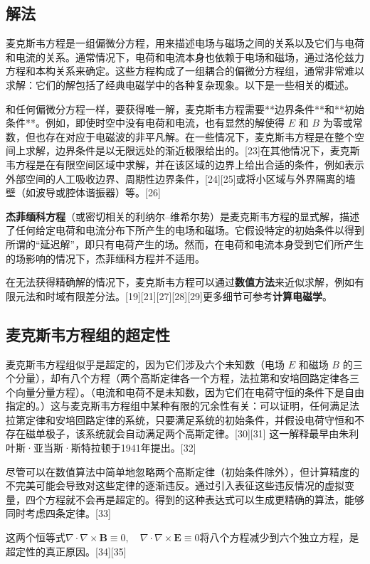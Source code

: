 \subsection{解法}
麦克斯韦方程是一组偏微分方程，用来描述电场与磁场之间的关系以及它们与电荷和电流的关系。通常情况下，电荷和电流本身也依赖于电场和磁场，通过洛伦兹力方程和本构关系来确定。这些方程构成了一组耦合的偏微分方程组，通常非常难以求解：它们的解包括了经典电磁学中的各种复杂现象。以下是一些相关的概述。

和任何偏微分方程一样，要获得唯一解，麦克斯韦方程需要**边界条件**和**初始条件**。例如，即使时空中没有电荷和电流，也有显然的解使得 \( E \) 和 \( B \) 为零或常数，但也存在对应于电磁波的非平凡解。在一些情况下，麦克斯韦方程是在整个空间上求解，边界条件是以无限远处的渐近极限给出的。[23]在其他情况下，麦克斯韦方程是在有限空间区域中求解，并在该区域的边界上给出合适的条件，例如表示外部空间的人工吸收边界、周期性边界条件，[24][25]或将小区域与外界隔离的墙壁（如波导或腔体谐振器）等。[26]

\textbf{杰菲缅科方程}（或密切相关的利纳尔–维希尔势）是麦克斯韦方程的显式解，描述了任何给定电荷和电流分布下所产生的电场和磁场。它假设特定的初始条件以得到所谓的“延迟解”，即只有电荷产生的场。然而，在电荷和电流本身受到它们所产生的场影响的情况下，杰菲缅科方程并不适用。

在无法获得精确解的情况下，麦克斯韦方程可以通过\textbf{数值方法}来近似求解，例如有限元法和时域有限差分法。[19][21][27][28][29]更多细节可参考\textbf{计算电磁学}。
\subsection{麦克斯韦方程组的超定性}
麦克斯韦方程组似乎是超定的，因为它们涉及六个未知数（电场 \(E\) 和磁场 \(B\) 的三个分量），却有八个方程（两个高斯定律各一个方程，法拉第和安培回路定律各三个向量分量方程）。（电流和电荷不是未知数，因为它们在电荷守恒的条件下是自由指定的。）这与麦克斯韦方程组中某种有限的冗余性有关：可以证明，任何满足法拉第定律和安培回路定律的系统，只要满足系统的初始条件，并假设电荷守恒和不存在磁单极子，该系统就会自动满足两个高斯定律。[30][31] 这一解释最早由朱利叶斯·亚当斯·斯特拉顿于1941年提出。[32]

尽管可以在数值算法中简单地忽略两个高斯定律（初始条件除外），但计算精度的不完美可能会导致对这些定律的逐渐违反。通过引入表征这些违反情况的虚拟变量，四个方程就不会再是超定的。得到的这种表达式可以生成更精确的算法，能够同时考虑四条定律。[33]

这两个恒等式\(\nabla \cdot \nabla \times \mathbf{B} \equiv 0, \quad \nabla \cdot \nabla \times \mathbf{E} \equiv 0\)将八个方程减少到六个独立方程，是超定性的真正原因。[34][35]

